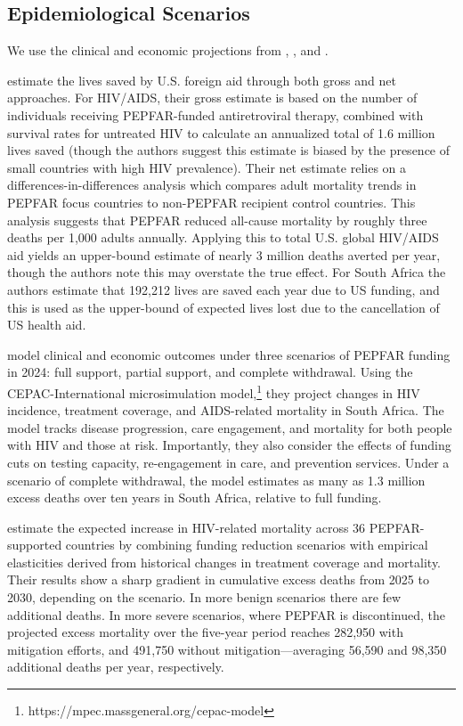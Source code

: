 \documentclass[letterpaper,12pt]{article}
\theoremstyle{definition}
\begin{document}
\begin{spacing}{1.5}
\subsection{Epidemiological Scenarios}
We use the clinical and economic projections from \citet{KS2025}, \citet{Gandhi2025}, and \citet{Brink2025}. 

\citet{KS2025} estimate the lives saved by U.S. foreign aid through both gross and net approaches. For HIV/AIDS, their gross estimate is based on the number of individuals receiving PEPFAR-funded antiretroviral therapy, combined with survival rates for untreated HIV to calculate an annualized total of 1.6 million lives saved (though the authors suggest this estimate is biased by the presence of small countries with high HIV prevalence). Their net estimate relies on a differences-in-differences analysis which compares adult mortality trends in PEPFAR focus countries to non-PEPFAR recipient control countries. This analysis suggests that PEPFAR reduced all-cause mortality by roughly three deaths per 1,000 adults annually. Applying this to total U.S. global HIV/AIDS aid yields an upper-bound estimate of nearly 3 million deaths averted per year, though the authors note this may overstate the true effect. For South Africa the authors estimate that 192,212 lives are saved each year due to US funding, and this is used as the upper-bound of expected lives lost due to the cancellation of US health aid. 

\citet{Gandhi2025} model clinical and economic outcomes under three scenarios of PEPFAR funding in 2024: full support, partial support, and complete withdrawal. Using the CEPAC-International microsimulation model,\footnote{https://mpec.massgeneral.org/cepac-model} they project changes in HIV incidence, treatment coverage, and AIDS-related mortality in South Africa. The model tracks disease progression, care engagement, and mortality for both people with HIV and those at risk. Importantly, they also consider the effects of funding cuts on testing capacity, re-engagement in care, and prevention services. Under a scenario of complete withdrawal, the model estimates as many as 1.3 million excess deaths over ten years in South Africa, relative to full funding.

 estimate the expected increase in HIV-related mortality across 36 PEPFAR-supported countries by combining funding reduction scenarios with empirical elasticities derived from historical changes in treatment coverage and mortality. Their results show a sharp gradient in cumulative excess deaths from 2025 to 2030, depending on the scenario. In more benign scenarios there are few additional deaths. In more severe scenarios, where PEPFAR is discontinued, the projected excess mortality over the five-year period reaches 282,950 with mitigation efforts, and 491,750 without mitigation—averaging 56,590 and 98,350 additional deaths per year, respectively.


\end{spacing}
\end{document}
